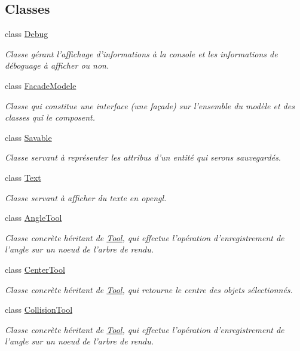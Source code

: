 \subsection*{Classes}
\begin{DoxyCompactItemize}
\item 
class \hyperlink{class_debug}{Debug}
\begin{DoxyCompactList}\small\item\em Classe gérant l'affichage d'informations à la console et les informations de déboguage à afficher ou non. \end{DoxyCompactList}\item 
class \hyperlink{class_facade_modele}{Facade\-Modele}
\begin{DoxyCompactList}\small\item\em Classe qui constitue une interface (une façade) sur l'ensemble du modèle et des classes qui le composent. \end{DoxyCompactList}\item 
class \hyperlink{class_savable}{Savable}
\begin{DoxyCompactList}\small\item\em Classe servant à représenter les attribus d'un entité qui serons sauvegardés. \end{DoxyCompactList}\item 
class \hyperlink{class_text}{Text}
\begin{DoxyCompactList}\small\item\em Classe servant à afficher du texte en opengl. \end{DoxyCompactList}\item 
class \hyperlink{class_angle_tool}{Angle\-Tool}
\begin{DoxyCompactList}\small\item\em Classe concrète héritant de \hyperlink{class_tool}{Tool}, qui effectue l'opération d'enregistrement de l'angle sur un noeud de l'arbre de rendu. \end{DoxyCompactList}\item 
class \hyperlink{class_center_tool}{Center\-Tool}
\begin{DoxyCompactList}\small\item\em Classe concrète héritant de \hyperlink{class_tool}{Tool}, qui retourne le centre des objets sélectionnés. \end{DoxyCompactList}\item 
class \hyperlink{class_collision_tool}{Collision\-Tool}
\begin{DoxyCompactList}\small\item\em Classe concrète héritant de \hyperlink{class_tool}{Tool}, qui effectue l'opération d'enregistrement de l'angle sur un noeud de l'arbre de rendu. \end{DoxyCompactList}\item 

\end{DoxyCompactItemize}
